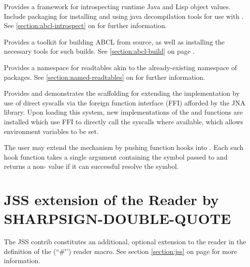 \documentclass[10pt]{book}
\begin{document}
\begin{description}[style=nextline]
\begin{description}[style=nextline]
    \item[\code{abcl-introspect}] Provides a framework for
      introspecting runtime Java and Lisp object values.  Include
      packaging for installing and using java decompilation tools
      for use with .  See
      \ref{section:abcl-introspect} on
      \pageref{section:abcl-introspect} for further information.
      
    \item[\code{abcl-build}] Provides a toolkit for building ABCL
      from source, as well as installing the necessary tools for
      such builds.  See \ref{section:abcl-build} on page
      \pageref{section:abcl-build}.

    \item[\code{named-readtables}] Provides a namespace for
      readtables akin to the already-existing namespace of packages.
      See \ref{section:named-readtables} on
      \pageref{section:named-readtables} for further information.

    \item[\code{posix-syscalls}] Provides and demonstrates the
      scaffolding for extending the implementation by use of direct
      syscalls via the foreign function interface (FFI) afforded by
      the JNA library.  Upon loading this system, new implementations
      of the  and  functions are
      installed which use FFI to directly call the  syscalls
      where available, which allows environment variables to be set.
      
    \end{description}
\end{description}

The user may extend the  mechanism by pushing
function hooks into .  Each
such hook function takes a single argument containing the symbol
passed to  and returns a non- value if it
can successful resolve the symbol.

\section{JSS extension of the Reader by SHARPSIGN-DOUBLE-QUOTE}

The JSS contrib constitutes an additional, optional extension to the
reader in the definition of the 
(``\#\"'') reader macro.  See section \ref{section:jss} on page
\pageref{section:jss} for more information.
\end{document}
